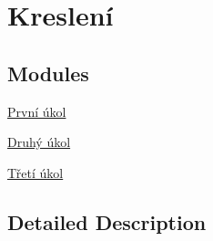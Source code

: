 \hypertarget{group__draw}{}\section{Kreslení}
\label{group__draw}
\subsection*{Modules}
\begin{DoxyCompactItemize}
\item 
\hyperlink{group__task1}{První úkol}
\item 
\hyperlink{group__task2}{Druhý úkol}
\item 
\hyperlink{group__task3}{Třetí úkol}
\end{DoxyCompactItemize}


\subsection{Detailed Description}
